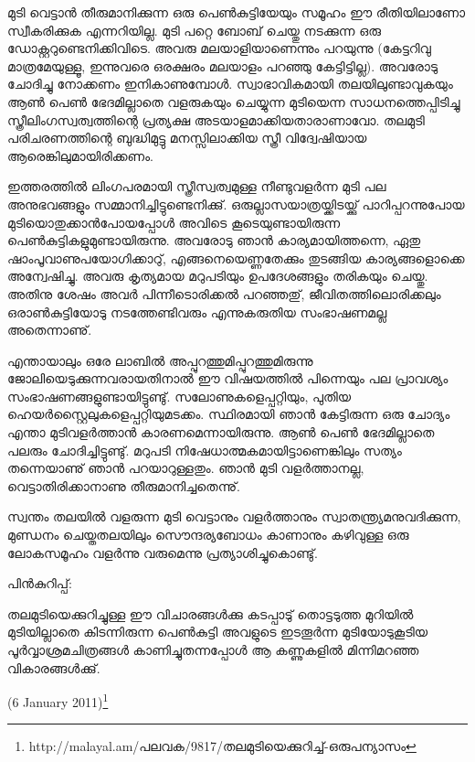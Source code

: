 മുടി വെട്ടാന്‍ തീരുമാനിക്കുന്ന ഒരു പെണ്‍കുട്ടിയേയും സമൂഹം ഈ രീതിയിലാണോ സ്വീകരിക്കുക എന്നറിയില്ല. മുടി പറ്റെ 
ബോബ് ചെയ്തു നടക്കുന്ന ഒരു ഡോക്റ്ററുണ്ടെനിക്കിവിടെ. അവരു മലയാളിയാണെന്നും പറയുന്നു (കേട്ടറിവു മാത്രമേയുള്ളൂ, 
ഇന്നുവരെ ഒരക്ഷരം മലയാളം പറഞ്ഞു കേട്ടിട്ടില്ല). അവരോടു ചോദിച്ചു നോക്കണം ഇനികാണുമ്പോള്‍. സ്വാഭാവികമായി 
തലയിലുണ്ടാവുകയും ആണ്‍ പെണ്‍ ഭേദമില്ലാതെ വളരുകയും ചെയ്യുന്ന മുടിയെന്ന സാധനത്തെപ്പിടിച്ചു 
സ്ത്രീലിംഗസ്വത്വത്തിന്റെ പ്രത്യക്ഷ അടയാളമാക്കിയതാരാണാവോ. തലമുടി പരിചരണത്തിന്റെ ബുദ്ധിമുട്ടു മനസ്സിലാക്കിയ സ്ത്രീ 
വിദ്വേഷിയായ ആരെങ്കിലുമായിരിക്കണം.

ഇത്തരത്തില്‍ ലിംഗപരമായി സ്ത്രീസ്വത്വമുള്ള നീണ്ടുവളര്‍ന്ന മുടി പല അനുഭവങ്ങളും സമ്മാനിച്ചിട്ടുണ്ടെനിക്കു്. 
ഒരുല്ലാസയാത്രയ്ക്കിടയ്ക്കു് പാറിപ്പറന്നുപോയ മുടിയൊതുക്കാന്‍പോയപ്പോള്‍ അവിടെ കൂടെയുണ്ടായിരുന്ന 
പെണ്‍കുട്ടികളുമുണ്ടായിരുന്നു. അവരോടു ഞാന്‍ കാര്യമായിത്തന്നെ, ഏതു ഷാംപൂവാണുപയോഗിക്കാറു്, എങ്ങനെയെണ്ണതേക്കും 
തുടങ്ങിയ കാര്യങ്ങളൊക്കെ അന്വേഷിച്ചു. അവരു കൃത്യമായ മറുപടിയും ഉപദേശങ്ങളും തരികയും ചെയ്തു. അതിനു ശേഷം അവര്‍ പിന്നീടൊരിക്കല്‍ പറഞ്ഞതു്, ജീവിതത്തിലൊരിക്കലും ഒരാണ്‍കുട്ടിയോടു നടത്തേണ്ടിവരും എന്നുകരുതിയ സംഭാഷണമല്ല 
അതെന്നാണു്.

എന്തായാലും ഒരേ ലാബില്‍ അപ്പുറത്തുമിപ്പുറത്തുമിരുന്നു ജോലിയെടുക്കുന്നവരായതിനാല്‍ ഈ വിഷയത്തില്‍ പിന്നെയും 
പല പ്രാവശ്യം സംഭാഷണങ്ങളുണ്ടായിട്ടുണ്ടു്. സലോണുകളെപ്പറ്റിയും, പുതിയ ഹെയര്‍സ്റ്റൈലുകളെപ്പറ്റിയുമടക്കം. 
സ്ഥിരമായി ഞാന്‍ കേട്ടിരുന്ന ഒരു ചോദ്യം എന്താ മുടിവളര്‍ത്താന്‍ കാരണമെന്നായിരുന്നു. ആണ്‍ പെണ്‍ ഭേദമില്ലാതെ 
പലരും ചോദിച്ചിട്ടുണ്ടു്. മറുപടി നിഷേധാത്മകമായിട്ടാണെങ്കിലും സത്യം തന്നെയാണു് ഞാന്‍ പറയാറുള്ളതും. ഞാന്‍ മുടി 
വളര്‍ത്താനല്ല, വെട്ടാതിരിക്കാനാണു തീരുമാനിച്ചതെന്നു്.

സ്വന്തം തലയില്‍ വളരുന്ന മുടി വെട്ടാനും വളര്‍ത്താനും സ്വാതന്ത്ര്യമനുവദിക്കുന്ന, മുണ്ഡനം ചെയ്തതലയിലും 
സൌന്ദര്യബോധം കാണാനും കഴിവുള്ള ഒരു ലോകസമൂഹം വളര്‍ന്നു വരുമെന്നു പ്രത്യാശിച്ചുകൊണ്ടു്.

പിന്‍കുറിപ്പ്:

തലമുടിയെക്കുറിച്ചുള്ള ഈ വിചാരങ്ങള്‍ക്കു കടപ്പാടു് തൊട്ടടുത്ത മുറിയില്‍ മുടിയില്ലാതെ കിടന്നിരുന്ന പെണ്‍കുട്ടി അവളുടെ ഇടതൂര്‍ന്ന മുടിയോടുകൂടിയ പൂര്‍വ്വാശ്രമചിത്രങ്ങള്‍ കാണിച്ചുതന്നപ്പോള്‍ ആ കണ്ണുകളില്‍ മിന്നിമറഞ്ഞ വികാരങ്ങള്‍ക്കു്.

(6 January 2011)\footnote{http://malayal.am/പലവക/9817/തലമുടിയെക്കുറിച്ച്-ഒരുപന്യാസം}

\newpage
